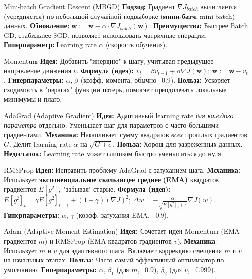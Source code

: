 \begin{myblock}{Mini-batch Gradient Descent (MBGD)}
    \textbf{Подход:} Градиент $\nabla J_{batch}$ вычисляется (усредняется) по небольшой случайной подвыборке (\textbf{мини-батч}, mini-batch) данных.
    \textbf{Обновление:} $\mathbf{w} := \mathbf{w} - \alpha \cdot \nabla J_{batch}(\mathbf{w})$.
    \textbf{Преимущества:} Быстрее Batch GD, стабильнее SGD, позволяет использовать матричные операции.
    \textbf{Гиперпараметр:} Learning rate $\alpha$ (скорость обучения).
\end{myblock}

\begin{myblock}{Momentum}
    \textbf{Идея:} Добавить "инерцию" к шагу, учитывая предыдущее направление движения $v$.
    \textbf{Формула (идея):} $v_t = \beta v_{t-1} + \alpha \nabla J(\mathbf{w})$; $\mathbf{w} := \mathbf{w} - v_t$.
    \textbf{Гиперпараметры:} $\alpha$, $\beta$ (коэфф. момента, обычно ~0.9).
    \textbf{Польза:} Ускоряет сходимость в "оврагах" функции потерь, помогает преодолевать локальные минимумы и плато.
\end{myblock}

\begin{myblock}{AdaGrad (Adaptive Gradient)}
    \textbf{Идея:} Адаптивный learning rate \textit{для каждого параметра} отдельно. Уменьшает шаг для параметров с часто большими градиентами.
    \textbf{Механика:} Накапливает сумму квадратов \textit{всех} прошлых градиентов $G$. Делит learning rate $\alpha$ на $\sqrt{G + \epsilon}$.
    \textbf{Польза:} Хорош для разреженных данных.
    \textbf{Недостаток:} Learning rate может слишком быстро уменьшиться до нуля.
\end{myblock}

\begin{myblock}{RMSProp}
    \textbf{Идея:} Исправить проблему AdaGrad с затуханием шага.
    \textbf{Механика:} Использует \textbf{экспоненциальное скользящее среднее (EMA)} квадратов градиентов $E[g^2]$, "забывая" старые.
    \textbf{Формула (идея):} $E[g^2]_t = \gamma E[g^2]_{t-1} + (1-\gamma)(\nabla J)^2$; $\Delta w = -\frac{\alpha}{\sqrt{E[g^2]_t + \epsilon}} \nabla J(w)$.
    \textbf{Гиперпараметры:} $\alpha$, $\gamma$ (коэфф. затухания EMA, ~0.9).
\end{myblock}

\begin{myblock}{Adam (Adaptive Moment Estimation)}
    \textbf{Идея:} Сочетает идеи Momentum (EMA градиентов $m$) и RMSProp (EMA квадратов градиентов $v$).
    \textbf{Механика:} Использует $m$ и $v$ для адаптивного шага. Включает коррекцию смещения $m$ и $v$ на начальных этапах.
    \textbf{Польза:} Часто самый эффективный оптимизатор по умолчанию.
    \textbf{Гиперпараметры:} $\alpha$, $\beta_1$ (для $m$, ~0.9), $\beta_2$ (для $v$, ~0.999).
\end{myblock}

